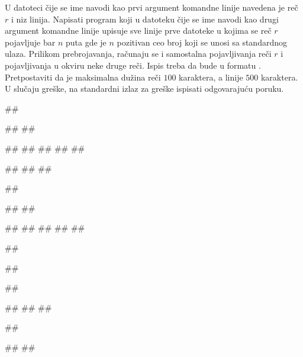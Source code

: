 \begin{Exercise}[label=v3_04] 
U datoteci čije se ime navodi kao prvi argument komandne
linije navedena je reč $r$ i niz linija. Napisati
program koji u datoteku čije se ime navodi kao
drugi argument komandne linije upisuje sve linije prve datoteke 
u kojima se reč $r$ pojavljuje bar $n$ puta gde je
$n$ pozitivan ceo broj koji se unosi sa standardnog ulaza. 
Prilikom prebrojavanja, računaju se i samostalna pojavljivanja reči $r$ i pojavljivanja u okviru neke druge reči. 
Ispis treba da bude u formatu .
Pretpostaviti da je maksimalna dužina reči $100$ karaktera, a linije $500$ karaktera.
U slučaju greške, na standardni izlaz za greške ispisati odgovarajuću poruku.
 
\begin{miditest}
\begin{upotreba}{1}
##

#\naslovInt#
##

##
##
##
## 
##

##
## 
##
\end{upotreba}
\end{miditest}
\begin{miditest}
\begin{upotreba}{2}
##

#\naslovInt#
##

##
##
##
## 
##

##

\end{upotreba}
\end{miditest}

\begin{miditest}
\begin{upotreba}{3}
##

##

#\naslovIzlazZaGresku#
##
##
\end{upotreba}
\end{miditest}
\begin{miditest}
\begin{upotreba}{4}
##

#\naslovIzlazZaGresku#
##
\end{upotreba}
\end{miditest}
\end{Exercise}
\begin{Answer}[ref=v3_04]
\end{Answer}


